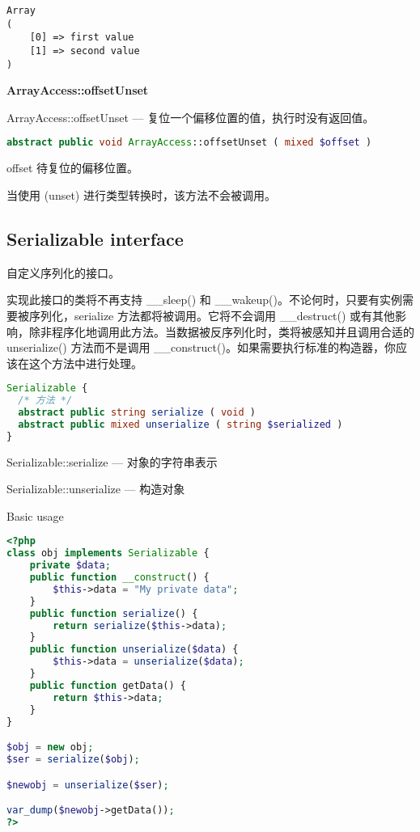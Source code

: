 \begin{verbatim}
Array
(
    [0] => first value
    [1] => second value
)
\end{verbatim}

\textbf{ArrayAccess::offsetUnset}

ArrayAccess::offsetUnset — 复位一个偏移位置的值，执行时没有返回值。



\begin{lstlisting}[language=PHP]
abstract public void ArrayAccess::offsetUnset ( mixed $offset )
\end{lstlisting}

\begin{compactitem}
\item offset
待复位的偏移位置。
\end{compactitem}

当使用 (unset) 进行类型转换时，该方法不会被调用。


\subsection{Serializable interface}

自定义序列化的接口。

实现此接口的类将不再支持 \_\_sleep() 和 \_\_wakeup()。不论何时，只要有实例需要被序列化，serialize 方法都将被调用。它将不会调用 \_\_destruct() 或有其他影响，除非程序化地调用此方法。当数据被反序列化时，类将被感知并且调用合适的 unserialize() 方法而不是调用 \_\_construct()。如果需要执行标准的构造器，你应该在这个方法中进行处理。



\begin{lstlisting}[language=PHP]
Serializable {
  /* 方法 */
  abstract public string serialize ( void )
  abstract public mixed unserialize ( string $serialized )
}
\end{lstlisting}

\begin{compactitem}
\item Serializable::serialize — 对象的字符串表示
\item Serializable::unserialize — 构造对象
\end{compactitem}


\begin{example}
Basic usage
\begin{lstlisting}[language=PHP]
<?php
class obj implements Serializable {
    private $data;
    public function __construct() {
        $this->data = "My private data";
    }
    public function serialize() {
        return serialize($this->data);
    }
    public function unserialize($data) {
        $this->data = unserialize($data);
    }
    public function getData() {
        return $this->data;
    }
}

$obj = new obj;
$ser = serialize($obj);

$newobj = unserialize($ser);

var_dump($newobj->getData());
?>
\end{lstlisting}
\end{example}



